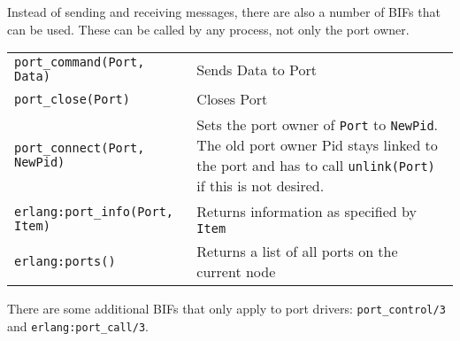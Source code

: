 Instead of sending and receiving messages, there are also a number of
BIFs that can be used. These can be called by any process, not only
the port owner.

\begin{center}
\begin{tabular}{|>{\raggedright}p{146pt}|>{\raggedright}p{180pt}|}
\hline
\multicolumn{2}{|p{326pt}|}{Port BIFs}\tabularnewline
\hline
\texttt{port\_command(Port, Data)}  & Sends Data to Port\tabularnewline
\hline
\texttt{port\_close(Port)}  & Closes Port\tabularnewline
\hline
\texttt{port\_connect(Port, NewPid)}  & Sets the port owner of \texttt{Port} to \texttt{NewPid}. The old port owner Pid stays linked to the port and has to call \texttt{unlink(Port)} if this is not desired. \tabularnewline
\hline
\texttt{erlang:port\_info(Port, Item)}  & Returns information as specified by \texttt{Item}\tabularnewline
\hline
\texttt{erlang:ports()}  & Returns a list of all ports on the current node\tabularnewline
\hline
\end{tabular}
\end{center}

There are some additional BIFs that only apply to port drivers:
\texttt{port\_control/3} and \texttt{erlang:port\_call/3}.